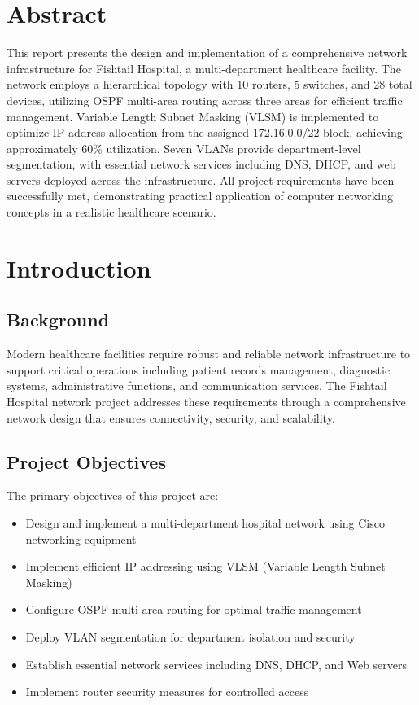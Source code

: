 \documentclass[12pt,a4paper]{report}
\begin{document}

\chapter*{Abstract}

This report presents the design and implementation of a comprehensive network infrastructure for Fishtail Hospital, a multi-department healthcare facility. The network employs a hierarchical topology with 10 routers, 5 switches, and 28 total devices, utilizing OSPF multi-area routing across three areas for efficient traffic management. Variable Length Subnet Masking (VLSM) is implemented to optimize IP address allocation from the assigned 172.16.0.0/22 block, achieving approximately 60\% utilization. Seven VLANs provide department-level segmentation, with essential network services including DNS, DHCP, and web servers deployed across the infrastructure. All project requirements have been successfully met, demonstrating practical application of computer networking concepts in a realistic healthcare scenario.

\newpage

\chapter{Introduction}

\section{Background}
Modern healthcare facilities require robust and reliable network infrastructure to support critical operations including patient records management, diagnostic systems, administrative functions, and communication services. The Fishtail Hospital network project addresses these requirements through a comprehensive network design that ensures connectivity, security, and scalability.

\section{Project Objectives}
The primary objectives of this project are:
\begin{itemize}[noitemsep]
    \item Design and implement a multi-department hospital network using Cisco networking equipment
    \item Implement efficient IP addressing using VLSM (Variable Length Subnet Masking)
    \item Configure OSPF multi-area routing for optimal traffic management
    \item Deploy VLAN segmentation for department isolation and security
    \item Establish essential network services including DNS, DHCP, and Web servers
    \item Implement router security measures for controlled access
\end{itemize}
\end{document}
